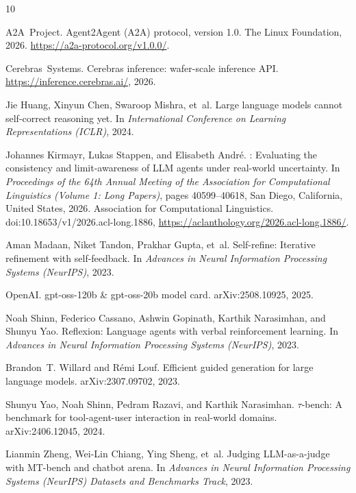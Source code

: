 \documentclass{article}
\begin{document}

\begin{thebibliography}{10}

A2A~Project.
\newblock Agent2{A}gent ({A}2{A}) protocol, version 1.0.
\newblock The Linux Foundation, 2026. \url{https://a2a-protocol.org/v1.0.0/}.

Cerebras~Systems.
\newblock Cerebras inference: wafer-scale inference {API}.
\newblock \url{https://inference.cerebras.ai/}, 2026.

Jie Huang, Xinyun Chen, Swaroop Mishra, et~al.
\newblock Large language models cannot self-correct reasoning yet.
\newblock In \emph{International Conference on Learning Representations
  (ICLR)}, 2024.

Johannes Kirmayr, Lukas Stappen, and Elisabeth Andr\'e.
: Evaluating the consistency and limit-awareness of
  {LLM} agents under real-world uncertainty.
\newblock In \emph{Proceedings of the 64th Annual Meeting of the Association
  for Computational Linguistics (Volume 1: Long Papers)}, pages 40599--40618,
  San Diego, California, United States, 2026. Association for Computational
  Linguistics. doi:10.18653/v1/2026.acl-long.1886,
  \url{https://aclanthology.org/2026.acl-long.1886/}.

Aman Madaan, Niket Tandon, Prakhar Gupta, et~al.
\newblock Self-refine: Iterative refinement with self-feedback.
\newblock In \emph{Advances in Neural Information Processing Systems
  (NeurIPS)}, 2023.

OpenAI.
\newblock gpt-oss-120b \& gpt-oss-20b model card.
\newblock arXiv:2508.10925, 2025.

Noah Shinn, Federico Cassano, Ashwin Gopinath, Karthik Narasimhan, and
  Shunyu Yao.
\newblock Reflexion: Language agents with verbal reinforcement learning.
\newblock In \emph{Advances in Neural Information Processing Systems
  (NeurIPS)}, 2023.

Brandon~T. Willard and R\'emi Louf.
\newblock Efficient guided generation for large language models.
\newblock arXiv:2307.09702, 2023.

Shunyu Yao, Noah Shinn, Pedram Razavi, and Karthik Narasimhan.
\newblock $\tau$-bench: A benchmark for tool-agent-user interaction in
  real-world domains.
\newblock arXiv:2406.12045, 2024.

Lianmin Zheng, Wei-Lin Chiang, Ying Sheng, et~al.
\newblock Judging {LLM}-as-a-judge with {MT}-bench and chatbot arena.
\newblock In \emph{Advances in Neural Information Processing Systems
  (NeurIPS) Datasets and Benchmarks Track}, 2023.

\end{thebibliography}
\end{document}
